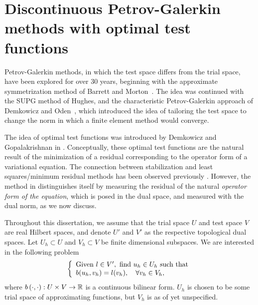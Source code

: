 \section{Discontinuous Petrov-Galerkin methods with optimal test functions}
 Petrov-Galerkin methods, in which the test space
differs from the trial space, have been explored for over 30 years,
beginning with the approximate symmetrization method of Barrett and
Morton~\cite{BARRETT01101981}. The idea was continued with the SUPG
method of Hughes, and the characteristic Petrov-Galerkin approach of
Demkowicz and Oden~\cite{Demkowicz1986188}, which introduced the
idea of tailoring the test space to change the norm in which a finite
element method would converge.

The idea of optimal test functions was introduced by Demkowicz and
Gopalakrishnan in \cite{DPG2}.  Conceptually, these optimal test
functions are the natural result of the minimization of a residual
corresponding to the operator form of a variational equation. The
connection between stabilization and least squares/minimum residual
methods has been observed previously \cite{GLS}. However, the method in \cite{DPG2} distinguishes itself
by measuring the residual of the natural \textit{operator form of the equation}, which is posed in the dual space, and measured with the dual norm, as we now discuss. 	

Throughout this dissertation, we assume that the trial space $U$ and test space $V$ are real Hilbert spaces, and denote $U'$ and $V'$ as the respective topological dual spaces. Let $U_h \subset U$ and $V_h\subset V$ be finite dimensional subspaces. We are interested in the following problem  
\begin{equation}
\eqnlab{variationEq}
\left\{
  \begin{array}{l}
    \text{Given } l \in V', \text{ find } u_h \in U_h  \text{ such that} \\ 
    b(u_h,v_h) = l(v_h), \quad \forall v_h\in V_h,
  \end{array}
  \right.
\end{equation}
where $b\LRp{\cdot,\cdot}: U \times V \to \mbb{R}$ is a continuous
bilinear form.  $U_h$ is chosen to be some trial space of approximating functions, but $V_h$ is as of yet unspecified. 

